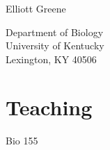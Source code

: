 \documentclass[11pt]{article}
\begin{document}
    \begin{center}
        \begin{minipage}{2.00in}\centering
            Elliott Greene
        \end{minipage}
        \begin{minipage}{2.00in} \centering
        Department of Biology \\
        University of Kentucky \\
        Lexington, KY 40506
        \end{minipage}
    \end{center}

    \section{Teaching}
        \begin{compactlist}
        \item Bio 155
        \end{compactlist}
\end{document}
